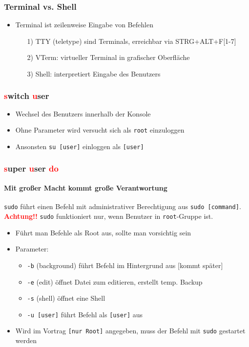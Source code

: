 \documentclass[12pt,utf8]{beamer}
\begin{document}
\begin{frame}
\frametitle{Terminal vs. Shell}
\begin{itemize}
	\item Terminal ist zeilenweise Eingabe von Befehlen
	\begin{itemize}
		\item[1)] TTY (teletype) sind Terminals, erreichbar via STRG+ALT+F[1-7]
		\item[2)] VTerm: virtueller Terminal in grafischer Oberfläche
		\item[3)] Shell: interpretiert Eingabe des Benutzers
	\end{itemize}
\end{itemize}
\end{frame}

\begin{frame}
\frametitle{\textcolor{red}{s}witch \textcolor{red}{u}ser}
\begin{itemize}
	\item Wechsel des Benutzers innerhalb der Konsole
	\item Ohne Parameter wird versucht sich als \texttt{root} einzuloggen
	\item Ansonsten \texttt{su [user]} einloggen als \texttt{[user]}
\end{itemize}
\end{frame}

\begin{frame}
\frametitle{\textcolor{red}{s}uper \textcolor{red}{u}ser \textcolor{red}{do}}
\framesubtitle{\textcolor{ownDarkOr}{Mit großer Macht kommt große Verantwortung}}
\texttt{sudo} führt einen Befehl mit administrativer Berechtigung aus \texttt{sudo [command]}.
\textbf{\textcolor{red}{Achtung!!}} \texttt{sudo} funktioniert nur, wenn Benutzer in \texttt{root}-Gruppe ist.
\begin{itemize}
	\item Führt man Befehle als Root aus, sollte man vorsichtig sein
	\item Parameter:
	\begin{itemize}[<+->]
		\item {\scriptsize \texttt{-b} (background) führt Befehl im Hintergrund aus [kommt später]}
		\item {\scriptsize \texttt{-e} (edit) öffnet Datei zum editieren, erstellt temp. Backup}
		\item {\scriptsize \texttt{-s} (shell) öffnet eine Shell}
		\item {\scriptsize \texttt{-u [user]} führt Befehl als \texttt{[user]} aus}
	\end{itemize}
	\item Wird im Vortrag \texttt{[nur Root]} angegeben, muss der Befehl mit \texttt{sudo} gestartet werden
\end{itemize}
\end{frame}
\end{document}
